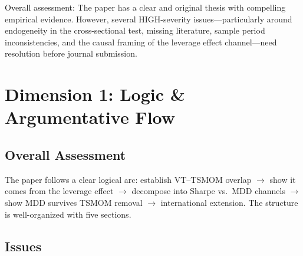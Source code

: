 \documentclass[12pt,a4paper]{article}
\begin{document}
\noindent Overall assessment: The paper has a clear and original thesis with compelling empirical evidence. However, several HIGH-severity issues---particularly around endogeneity in the cross-sectional test, missing literature, sample period inconsistencies, and the causal framing of the leverage effect channel---need resolution before journal submission.


\section{Dimension 1: Logic \& Argumentative Flow}

\subsection*{Overall Assessment}
The paper follows a clear logical arc: establish VT--TSMOM overlap $\to$ show it comes from the leverage effect $\to$ decompose into Sharpe vs.\ MDD channels $\to$ show MDD survives TSMOM removal $\to$ international extension. The structure is well-organized with five sections.

\subsection*{Issues}
\end{document}
